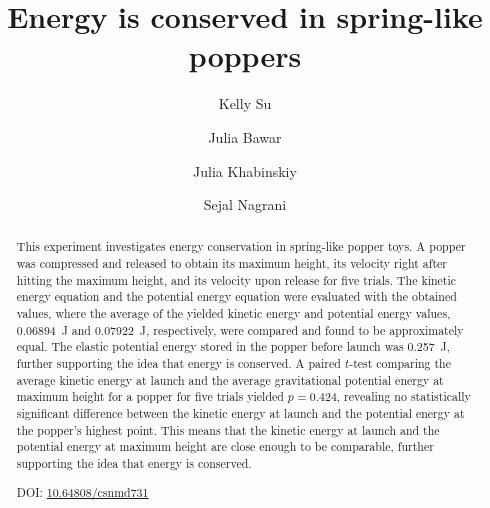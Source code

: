 \documentclass[reprint,amsmath,amssymb,aps,twoside]{revtex4-2} %
\begin{document}
\setcounter{page}{90} %

\title{Energy is conserved in spring-like poppers}
\author{Kelly Su}
\author{Julia Bawar}
\author{Julia Khabinskiy}
\author{Sejal Nagrani}


\begin{abstract}
This experiment investigates energy conservation in spring-like popper toys. A popper was compressed and released to obtain its maximum height, its velocity right after hitting the maximum height, and its velocity upon release for five trials. The kinetic energy equation and the potential energy equation were evaluated with the obtained values, where the average of the yielded kinetic energy and potential energy values, \qty{0.06894}{\joule} and \qty{0.07922}{\joule}, respectively, were compared and found to be approximately equal. The elastic potential energy stored in the popper before launch was \qty{0.257 }{\joule}, further supporting the idea that energy is conserved. A paired $t$-test comparing the average kinetic energy at launch and the average gravitational potential energy at maximum height for a popper for five trials yielded $p = 0.424$, revealing no statistically significant difference between the kinetic energy at launch and the potential energy at the popper’s highest point. This means that the kinetic energy at launch and the potential energy at maximum height are close enough to be comparable, further supporting the idea that energy is conserved.

\vspace{1em} %
\noindent DOI: \href{https://doi.org/10.64804/csnmd731}{10.64808/csnmd731}
\end{abstract}

\end{document}

